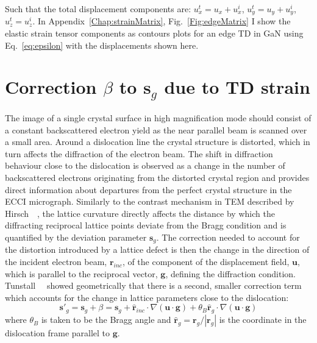 Such that the total displacement components are: $u^t_x = u_x + u^i_x$, $u^t_y = u_y + u^i_y$, $u^t_z =  u^i_z$. In Appendix~\ref{Chap:strainMatrix}, Fig.~\ref{Fig:edgeMatrix} I show the elastic strain tensor components as contours plots for an edge TD in GaN using Eq.~\ref{eq:epsilon}  with the displacements shown here.




\section{Correction \texorpdfstring{$\beta$}{beta} to \texorpdfstring{$\mathbf{s}_g$}{sg} due to TD strain}
\label{sec:beta}
The image of a single crystal surface in high magnification mode should consist of a constant backscattered electron yield as the near parallel beam is scanned over a small area. Around a dislocation line the crystal structure is distorted, which in turn affects the diffraction of the electron beam. The shift in diffraction behaviour close to the dislocation is observed as a change in the number of backscattered electrons originating from the distorted crystal region and provides direct information about departures from the perfect crystal structure in the ECCI micrograph. Similarly to the contrast mechanism in TEM described by Hirsch~\etal~\cite{Hirsch60}, the lattice curvature directly affects the distance by which the diffracting reciprocal lattice points deviate from the Bragg condition and is quantified by the deviation parameter $\mathbf{s}_g$. The correction needed to account for the distortion introduced by a lattice defect is then the change in the direction of the incident electron beam, $\mathbf{r}_{inc}$, of the component of the displacement field, $\mathbf{u}$, which is parallel to the reciprocal vector, $\mathbf{g}$, defining the diffraction condition. Tunstall~\etal~\cite{Tunstall64} showed geometrically that there is a second, smaller correction term which accounts for the change in lattice parameters close to the dislocation:
\begin{equation}
\label{eq:tunstall}
    \mathbf{s}'_g = \mathbf{s}_g + \beta = \mathbf{s}_g + \mathbf{\hat{r}}_{inc} \cdot \nabla(\mathbf{u} \cdot \mathbf{g}) + \theta_B \mathbf{\hat{r}}_{g} \cdot \nabla(\mathbf{u} \cdot \mathbf{g} )
\end{equation}
where $\theta_B$ is taken to be the Bragg angle and $\mathbf{\hat{r}}_{g}=\mathbf{r}_g/ |\mathbf{r}_g|$  is the coordinate in the dislocation frame parallel to $\mathbf{g}$.


